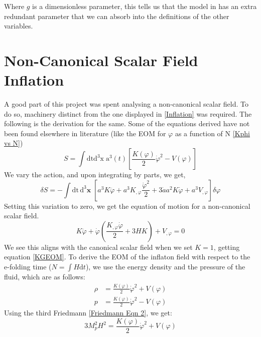 \documentclass[aps,prd,reprint,preprintnumbers,showpacs,floatfix,nofootinbib,superscript address]{revtex4-2}
\begin{document}
Where $g$ is a dimensionless parameter, this tells us that the model in \cite{barker2024poincaregaugetheoryconformal} has an extra redundant parameter that we can absorb into the definitions of the other variables.

\section{Non-Canonical Scalar Field Inflation} \label{Non-Canonical Scalar Field Inflation}

A good part of this project was spent analysing a non-canonical scalar field. To do so, machinery distinct from the one displayed in \cref{Inflation} was required. The following is the derivation for the same. Some of the equations derived have not been found elsewhere in literature (like the EOM for $\varphi$ as a function of N \cref{Kphi vs N})
\begin{equation} \label{13}
    S = \int \text{dt}\text{d}^3\text{x} \; \text{a}^3(t) \left[ \frac{K(\varphi)}{2}\dot{\varphi}^2 - V(\varphi) \right]
\end{equation}
We vary the action, and upon integrating by parts, we get,
\begin{equation}
    \delta S = - \int \text{dt}\,\text{d}^3\textbf{x} \; \left[ a^3 K \ddot{\varphi} + a^3K_{,\varphi} \frac{\dot{\varphi}^2}{2}  +  3\dot{a} a^2 K \dot{\varphi} + a^3V_{,\varphi}  \right]\delta \varphi
\end{equation}
Setting this variation to zero, we get the equation of motion for a non-canonical scalar field.
\begin{equation} \label{16}
    K \ddot{\varphi} + \dot{\varphi} \left(\frac{K_{,\varphi} \dot{\varphi}}{2} + 3H K \right) + V_{,\varphi}   = 0
\end{equation}
We see this aligns with the canonical scalar field when we set $K = 1$, getting equation \cref{KGEOM}. To derive the EOM of the inflaton field with respect to the e-folding time ($N = \int H \text{d}t$), we use the energy density and the pressure of the fluid, which are as follows: 
\begin{align}   \label{18}
    \rho &= \frac{K(\varphi)}{2} \dot{\varphi}^2 + V(\varphi) \nonumber \\
    p &= \frac{K(\varphi)}{2} \dot{\varphi}^2 - V(\varphi)
\end{align}
Using the third Friedmann \cref{Friedmann Eqn 2}, we get:
\begin{equation}    \label{19}
    3 M_p^2H^2 = \frac{K(\varphi)}{2} \dot{\varphi}^2 + V(\varphi)
\end{equation}
\end{document}
